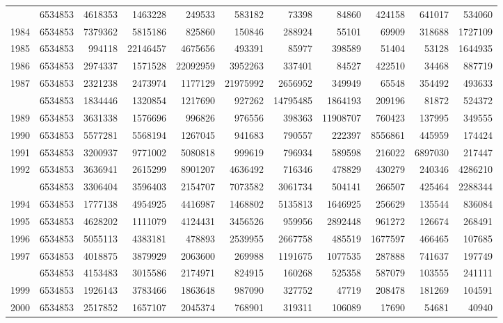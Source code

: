 \documentclass[
]{article}
\begin{document}
\begin{longtable}[t]{lrrrrrrrrrr}
\addlinespace
1983 & 6534853 & 4618353 & 1463228 & 249533 & 583182 & 73398 & 84860 & 424158 & 641017 & 534060\\
1984 & 6534853 & 7379362 & 5815186 & 825860 & 150846 & 288924 & 55101 & 69909 & 318688 & 1727109\\
1985 & 6534853 & 994118 & 22146457 & 4675656 & 493391 & 85977 & 398589 & 51404 & 53128 & 1644935\\
1986 & 6534853 & 2974337 & 1571528 & 22092959 & 3952263 & 337401 & 84527 & 422510 & 34468 & 887719\\
1987 & 6534853 & 2321238 & 2473974 & 1177129 & 21975992 & 2656952 & 349949 & 65548 & 354492 & 493633\\
\addlinespace
1988 & 6534853 & 1834446 & 1320854 & 1217690 & 927262 & 14795485 & 1864193 & 209196 & 81872 & 524372\\
1989 & 6534853 & 3631338 & 1576696 & 996826 & 976556 & 398363 & 11908707 & 760423 & 137995 & 349555\\
1990 & 6534853 & 5577281 & 5568194 & 1267045 & 941683 & 790557 & 222397 & 8556861 & 445959 & 174424\\
1991 & 6534853 & 3200937 & 9771002 & 5080818 & 999619 & 796934 & 589598 & 216022 & 6897030 & 217447\\
1992 & 6534853 & 3636941 & 2615299 & 8901207 & 4636492 & 716346 & 478829 & 430279 & 240346 & 4286210\\
\addlinespace
1993 & 6534853 & 3306404 & 3596403 & 2154707 & 7073582 & 3061734 & 504141 & 266507 & 425464 & 2288344\\
1994 & 6534853 & 1777138 & 4954925 & 4416987 & 1468802 & 5135813 & 1646925 & 256629 & 135544 & 836084\\
1995 & 6534853 & 4628202 & 1111079 & 4124431 & 3456526 & 959956 & 2892448 & 961272 & 126674 & 268491\\
1996 & 6534853 & 5055113 & 4383181 & 478893 & 2539955 & 2667758 & 485519 & 1677597 & 466465 & 107685\\
1997 & 6534853 & 4018875 & 3879929 & 2063600 & 269988 & 1191675 & 1077535 & 287888 & 741637 & 197749\\
\addlinespace
1998 & 6534853 & 4153483 & 3015586 & 2174971 & 824915 & 160268 & 525358 & 587079 & 103555 & 241111\\
1999 & 6534853 & 1926143 & 3783466 & 1863648 & 987090 & 327752 & 47719 & 208478 & 181269 & 104591\\
2000 & 6534853 & 2517852 & 1657107 & 2045374 & 768901 & 319311 & 106089 & 17690 & 54681 & 40940\\

\end{longtable}
\end{document}
